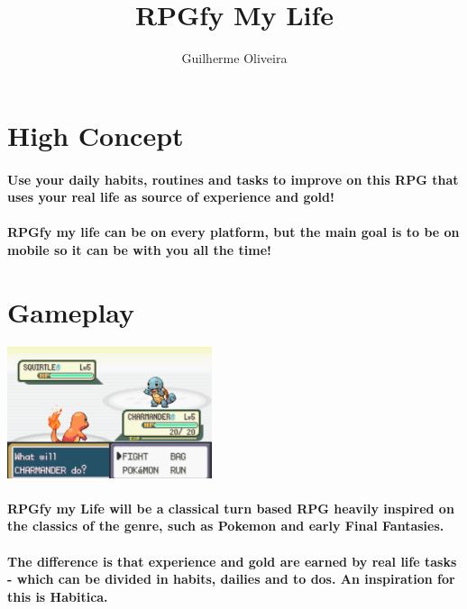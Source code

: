 \documentclass[12pt, twocolumn]{article}
\title{\vspace{-3.0cm}\titlefont RPGfy My Life}
\author{Guilherme Oliveira}
\date{}
\begin{document}
\maketitle

\section*{High Concept}
\paragraph{Use your daily habits, routines and tasks to improve on this RPG that uses your real life as source of experience and gold!}

\paragraph{RPGfy my life can be on every platform, but the main goal is to be on mobile so it can be with you all the time!}

\section*{Gameplay}

\begin{center}
\includegraphics[width=6cm]{images/pkm.png}
\end{center}

\paragraph{RPGfy my Life will be a classical turn based RPG heavily inspired on the classics of the genre, such as Pokemon and early Final Fantasies.}

\paragraph{The difference is that experience and gold are earned by real life tasks - which can be divided in habits, dailies and to dos. An inspiration for this is Habitica.}
\end{document}
